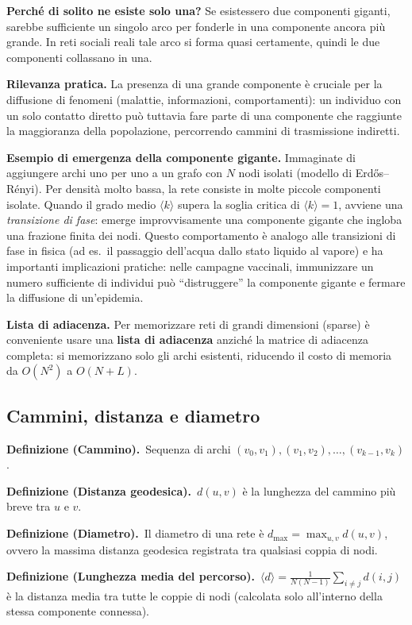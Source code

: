 \documentclass[12pt,a4paper]{article}
\newcommand{\definition}[2]{%
  \vspace{4pt}%
  \noindent\textbf{Definizione (#1).}\ #2\par\vspace{4pt}%
}
\begin{document}
\medskip
\noindent\textbf{Perché di solito ne esiste solo una?}
Se esistessero due componenti giganti, sarebbe sufficiente un singolo arco per fonderle
in una componente ancora più grande. In reti sociali reali tale arco si forma quasi certamente,
quindi le due componenti collassano in una.

\medskip
\noindent\textbf{Rilevanza pratica.}
La presenza di una grande componente è cruciale per la diffusione di fenomeni (malattie,
informazioni, comportamenti): un individuo con un solo contatto diretto può tuttavia fare
parte di una componente che raggiunte la maggioranza della popolazione, percorrendo
cammini di trasmissione indiretti.

\medskip
\noindent\textbf{Esempio di emergenza della componente gigante.}
Immaginate di aggiungere archi uno per uno a un grafo con $N$ nodi isolati (modello di Erdős–Rényi).
Per densità molto bassa, la rete consiste in molte piccole componenti isolate. Quando il grado
medio $\langle k \rangle$ supera la soglia critica di $\langle k \rangle = 1$, avviene una
\emph{transizione di fase}: emerge improvvisamente una componente gigante che ingloba una
frazione finita dei nodi. Questo comportamento è analogo alle transizioni di fase in fisica
(ad es.\ il passaggio dell'acqua dallo stato liquido al vapore) e ha importanti implicazioni
pratiche: nelle campagne vaccinali, immunizzare un numero sufficiente di individui può
``distruggere'' la componente gigante e fermare la diffusione di un'epidemia.

\medskip
\noindent\textbf{Lista di adiacenza.}
Per memorizzare reti di grandi dimensioni (sparse) è conveniente usare una
\textbf{lista di adiacenza} anziché la matrice di adiacenza completa: si memorizzano
solo gli archi esistenti, riducendo il costo di memoria da $O(N^2)$ a $O(N+L)$.

\subsection{Cammini, distanza e diametro}

\definition{Cammino}{Sequenza di archi $(v_0,v_1),(v_1,v_2),\ldots,(v_{k-1},v_k)$.}
\definition{Distanza geodesica}{$d(u,v)$ è la lunghezza del cammino più breve tra $u$ e $v$.}
\definition{Diametro}{Il diametro di una rete è $d_{\max} = \max_{u,v} d(u,v)$, ovvero la
massima distanza geodesica registrata tra qualsiasi coppia di nodi.}
\definition{Lunghezza media del percorso}{$\langle d \rangle = \frac{1}{N(N-1)}\sum_{i\neq j}d(i,j)$
è la distanza media tra tutte le coppie di nodi (calcolata solo all'interno della stessa
componente connessa).}
\end{document}

